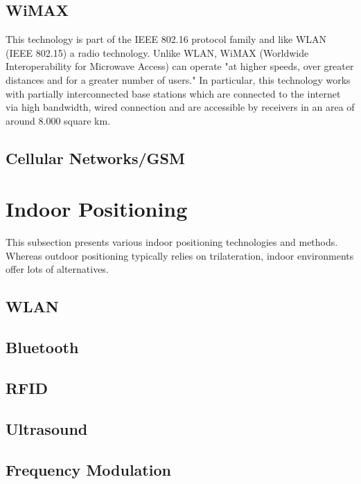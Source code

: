 
\subsection*{WiMAX}
This technology is part of the IEEE 802.16 protocol family and like WLAN (IEEE 802.15) a radio technology. Unlike WLAN, WiMAX (Worldwide Interoperability for Microwave Access) can operate "at higher speeds, over greater distances and for a greater number of users." \cite{wimax} In particular, this technology works with partially interconnected base stations which are connected to the internet via high bandwidth, wired connection and are accessible by receivers in an area of around 8.000 square km.


\subsection*{Cellular Networks/GSM}

\section{Indoor Positioning}

This subsection presents various indoor positioning technologies and methods.
Whereas outdoor positioning typically relies on trilateration, indoor environments offer lots of alternatives.


\subsection*{WLAN}

\subsection*{Bluetooth}

\subsection*{RFID}

\subsection*{Ultrasound}

\subsection*{Frequency Modulation}



